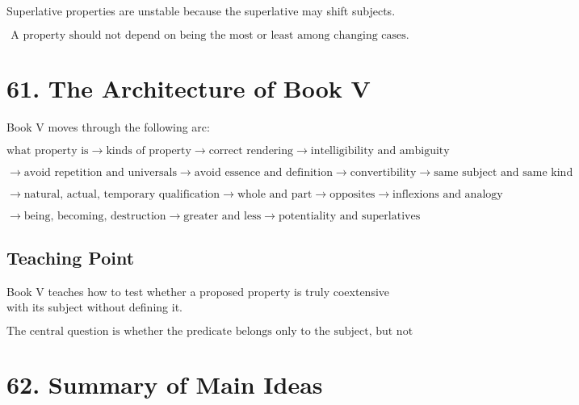 \documentclass[12pt]{article}
\begin{document}
Superlative properties are unstable because the superlative may shift subjects.

\[
\boxed{
\text{A property should not depend on being the most or least among changing cases.}
}
\]

\section*{61. The Architecture of Book V}

Book V moves through the following arc:

\[
\text{what property is}
\rightarrow
\text{kinds of property}
\rightarrow
\text{correct rendering}
\rightarrow
\text{intelligibility and ambiguity}
\]

\[
\rightarrow
\text{avoid repetition and universals}
\rightarrow
\text{avoid essence and definition}
\rightarrow
\text{convertibility}
\rightarrow
\text{same subject and same kind}
\]

\[
\rightarrow
\text{natural, actual, temporary qualification}
\rightarrow
\text{whole and part}
\rightarrow
\text{opposites}
\rightarrow
\text{inflexions and analogy}
\]

\[
\rightarrow
\text{being, becoming, destruction}
\rightarrow
\text{greater and less}
\rightarrow
\text{potentiality and superlatives}
\]

\subsection*{Teaching Point}

Book V teaches how to test whether a proposed property is truly coextensive
with its subject without defining it.

\[
\boxed{
\text{The central question is whether the predicate belongs only to the subject, but not as essence.}
}
\]

\section*{62. Summary of Main Ideas}
\end{document}
